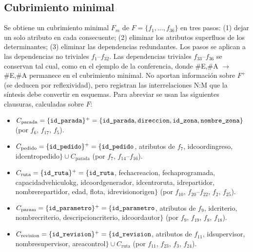 \documentclass[11pt,a4paper]{article}
\newcommand{\ubrk}{\textunderscore\allowbreak}
\newcommand{\campo}[1]{\textnormal{\ttfamily\let\_\ubrk #1}}
\begin{document}
\subsection{Cubrimiento minimal}\label{sec:cubrimiento}

Se obtiene un cubrimiento minimal $F_m$ de $F = \{f_1,\dots,f_{36}\}$ en tres pasos: (1) dejar un solo atributo en cada consecuente; (2) eliminar los atributos superfluos de los determinantes; (3) eliminar las dependencias redundantes. Los pasos se aplican a las dependencias no triviales $f_1$--$f_{32}$. Las dependencias triviales $f_{33}$--$f_{36}$ se conservan tal cual, como en el ejemplo de la conferencia, donde \#E,\#A $\rightarrow$ \#E,\#A permanece en el cubrimiento minimal. No aportan información sobre $F^+$ (se deducen por reflexividad), pero registran las interrelaciones N:M que la síntesis debe convertir en esquemas. Para abreviar se usan las siguientes clausuras, calculadas sobre $F$:

{\raggedright\small
\begin{itemize}
\item $C_{\text{parada}} = \{\campo{id\_parada}\}^+ = \{\campo{id\_parada}, \campo{direccion}, \campo{id\_zona}, \campo{nombre\_zona}\}$ (por $f_6$, $f_{17}$, $f_5$).
\item $C_{\text{pedido}} = \{\campo{id\_pedido}\}^+ = \{\campo{id\_pedido}$, atributos de $f_7$, \campo{id\_coord\_ingreso}, \campo{id\_centro\_pedido}$\} \cup C_{\text{parada}}$ (por $f_7$, $f_{14}$--$f_{16}$).
\item $C_{\text{ruta}} = \{\campo{id\_ruta}\}^+ = \{\campo{id\_ruta}$, \campo{fecha\_creacion}, \campo{fecha\_programada}, \campo{capacidad\_vehiculo\_kg}, \campo{id\_coord\_generador}, \campo{id\_centro\_ruta}, \campo{id\_repartidor}, \campo{nombre\_repartidor}, \campo{edad}, \campo{flota}, \campo{id\_revision\_origen}$\}$ (por $f_{10}$, $f_{20}$--$f_{22}$, $f_2$, $f_{25}$).
\item $C_{\text{param}} = \{\campo{id\_parametro}\}^+ = \{\campo{id\_parametro}$, atributos de $f_9$, \campo{id\_criterio}, \campo{nombre\_criterio}, \campo{descripcion\_criterio}, \campo{id\_coord\_autor}$\}$ (por $f_9$, $f_{19}$, $f_8$, $f_{18}$).
\item $C_{\text{revision}} = \{\campo{id\_revision}\}^+ = \{\campo{id\_revision}$, atributos de $f_{11}$, \campo{id\_supervisor}, \campo{nombre\_supervisor}, \campo{area\_control}$\} \cup C_{\text{ruta}}$ (por $f_{11}$, $f_{23}$, $f_3$, $f_{24}$).
\end{itemize}
\par}
\end{document}
